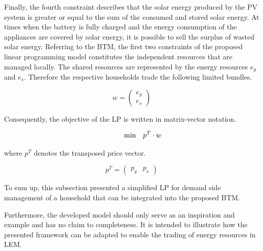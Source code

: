 Finally, the fourth constraint describes that the solar energy produced by the PV system is greater or equal to the sum of the consumed and stored solar energy. 
At times when the battery is fully charged and the energy consumption of the 
appliances are covered by solar energy, it is possible to sell the surplus of 
wasted solar energy.
Referring to the BTM, the first two constraints of the proposed linear
programming model constitutes the independent resources that are managed locally.
The shared resources are represented by 
the energy resources $e_{g}$ and $e_{s}$.
Therefore the respective households trade the following limited bundles.

\[
w=
  \begin{pmatrix}
e_{g} \\
e_{s}
  \end{pmatrix}
\]

Consequently, the objective of the LP is written in matrix-vector notation.

\begin{equation*}
 \begin{array}{ll@{}ll}
        \text{min} & \displaystyle p^{T} \cdot w
 \end{array}
\end{equation*}

where $p^{T}$ denotes the transposed price vector.

\[
p^{T} =
  \begin{pmatrix}
p_{g} &
p_{s}
  \end{pmatrix}
\]



To sum up, this subsection presented a simplified LP for demand side management of a household
that can be integrated into the proposed BTM.

Furthermore, the developed model should only serve as an inspiration and example
and has no claim to completeness. 
It is intended to illustrate how the presented framework can be adapted to enable the trading of energy resources in LEM. 

\clearpage
